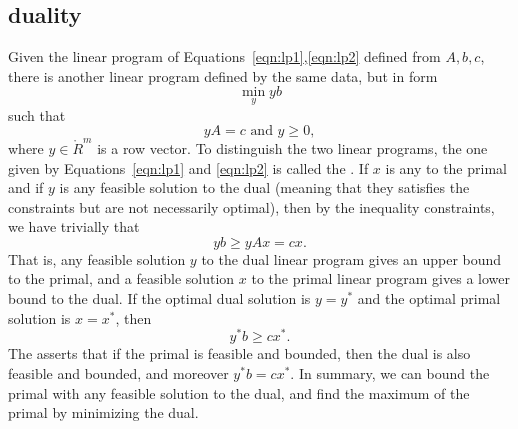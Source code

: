\subsection{duality}


Given the linear program of Equations~\ref{eqn:lp1},\ref{eqn:lp2}
defined from $A,b,c$, there is another linear program defined by
the same data, but in  form
\begin{equation}
\min_y {y b}
\end{equation}
such that
\begin{equation}
y A = c \text{ and } y \ge 0,
\end{equation}
where $y\in\ring{R}^m$ is a row vector.  To distinguish the two linear
programs, the one given by Equations~\ref{eqn:lp1} and \ref{eqn:lp2}
is called the .  If $x$ is any  to the primal and if $y$ is any feasible solution to the
dual (meaning that they satisfies the constraints but are not
necessarily optimal), then by the inequality constraints, we have
trivially that
$$y b \ge y A x = c x.$$
That is, any feasible solution $y$ to the dual linear program gives an
upper bound to the primal, and a feasible solution $x$ to the primal
linear program gives a lower bound to the dual.  If the optimal dual
solution is $y=y^*$ and the optimal primal solution is $x=x^*$, then
$$y^* b \ge c x^*.$$
The  asserts that if the
primal is feasible and bounded, then the dual is also feasible and
bounded, and moreover $y^* b = c x^*$.  In summary, we can bound the
primal with any feasible solution to the dual, and find the maximum of
the primal by minimizing the dual.

%
%


